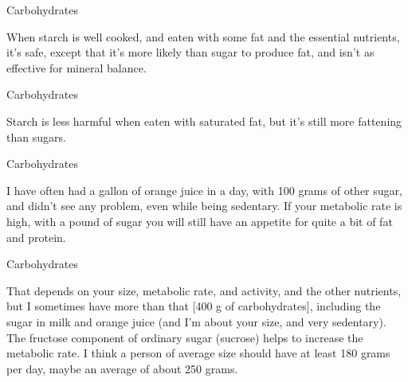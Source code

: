 \documentclass[11pt,oneside,openany,extrafontsizes]{memoir}
\begin{document}
\begin{standalonequote}{Carbohydrates}

    \begin{answer}
        When starch is well cooked, and eaten with some fat and the essential nutrients, it's safe, except that it's more likely than sugar to produce fat, and isn't as effective for mineral balance.
    \end{answer}
\end{standalonequote}

\begin{standalonequote}{Carbohydrates}

    \begin{answer}
        Starch is less harmful when eaten with saturated fat, but it's still more fattening than sugars.
    \end{answer}
\end{standalonequote}

\begin{standalonequote}{Carbohydrates}

    \begin{answer}
        I have often had a gallon of orange juice in a day, with 100 grams of other sugar, and didn't see any problem, even while being sedentary. If your metabolic rate is high, with a pound of sugar you will still have an appetite for quite a bit of fat and protein.
    \end{answer}
\end{standalonequote}

\begin{standalonequote}{Carbohydrates}

    \begin{answer}
        That depends on your size, metabolic rate, and activity, and the other nutrients, but I sometimes have more than that [400 g of carbohydrates], including the sugar in milk and orange juice (and I'm about your size, and very sedentary). The fructose component of ordinary sugar (sucrose) helps to increase the metabolic rate. I think a person of average size should have at least 180 grams per day, maybe an average of about 250 grams.
    \end{answer}
\end{standalonequote}
\end{document}

